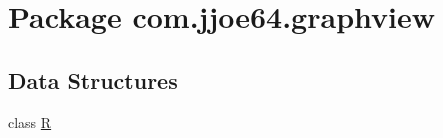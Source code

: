 \hypertarget{namespacecom_1_1jjoe64_1_1graphview}{}\section{Package com.\+jjoe64.\+graphview}
\label{namespacecom_1_1jjoe64_1_1graphview}
\subsection*{Data Structures}
\begin{DoxyCompactItemize}
\item 
class \mbox{\hyperlink{classcom_1_1jjoe64_1_1graphview_1_1_r}{R}}
\end{DoxyCompactItemize}
